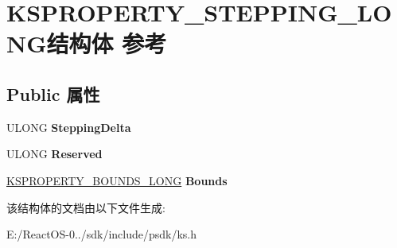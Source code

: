 \hypertarget{struct_k_s_p_r_o_p_e_r_t_y___s_t_e_p_p_i_n_g___l_o_n_g}{}\section{K\+S\+P\+R\+O\+P\+E\+R\+T\+Y\+\_\+\+S\+T\+E\+P\+P\+I\+N\+G\+\_\+\+L\+O\+N\+G结构体 参考}
\label{struct_k_s_p_r_o_p_e_r_t_y___s_t_e_p_p_i_n_g___l_o_n_g}
\subsection*{Public 属性}
\begin{DoxyCompactItemize}
\item 
\mbox{\label{struct_k_s_p_r_o_p_e_r_t_y___s_t_e_p_p_i_n_g___l_o_n_g_a366f54fbf259106218876708bbb472b1}} 
U\+L\+O\+NG {\bfseries Stepping\+Delta}
\item 
\mbox{\label{struct_k_s_p_r_o_p_e_r_t_y___s_t_e_p_p_i_n_g___l_o_n_g_abbcdbc86157c65a57dcdbb454d2ae7e0}} 
U\+L\+O\+NG {\bfseries Reserved}
\item 
\mbox{\label{struct_k_s_p_r_o_p_e_r_t_y___s_t_e_p_p_i_n_g___l_o_n_g_a265f259b6b07f9a798d2a21524468d18}} 
\hyperlink{union_k_s_p_r_o_p_e_r_t_y___b_o_u_n_d_s___l_o_n_g}{K\+S\+P\+R\+O\+P\+E\+R\+T\+Y\+\_\+\+B\+O\+U\+N\+D\+S\+\_\+\+L\+O\+NG} {\bfseries Bounds}
\end{DoxyCompactItemize}


该结构体的文档由以下文件生成\+:\begin{DoxyCompactItemize}
\item 
E\+:/\+React\+O\+S-\/0../sdk/include/psdk/ks.\+h\end{DoxyCompactItemize}
